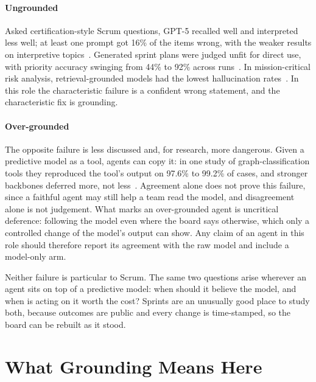 \documentclass[conference]{IEEEtran}
\begin{document}
\paragraph{Ungrounded} Asked certification-style Scrum questions, GPT-5 recalled well and interpreted less well; at least one prompt got 16\% of the items wrong, with the weaker results on interpretive topics~\cite{psm}. Generated sprint plans were judged unfit for direct use, with priority accuracy swinging from 44\% to 92\% across runs~\cite{yoon}. In mission-critical risk analysis, retrieval-grounded models had the lowest hallucination rates~\cite{esem24}. In this role the characteristic failure is a confident wrong statement, and the characteristic fix is grounding.

\paragraph{Over-grounded} The opposite failure is less discussed and, for research, more dangerous. Given a predictive model as a tool, agents can copy it: in one study of graph-classification tools they reproduced the tool's output on 97.6\% to 99.2\% of cases, and stronger backbones deferred more, not less~\cite{tool}. Agreement alone does not prove this failure, since a faithful agent may still help a team read the model, and disagreement alone is not judgement. What marks an over-grounded agent is uncritical deference: following the model even where the board says otherwise, which only a controlled change of the model's output can show. Any claim of an agent in this role should therefore report its agreement with the raw model and include a model-only arm.

Neither failure is particular to Scrum. The same two questions arise wherever an agent sits on top of a predictive model: when should it believe the model, and when is acting on it worth the cost? Sprints are an unusually good place to study both, because outcomes are public and every change is time-stamped, so the board can be rebuilt as it stood.

\section{What Grounding Means Here}
\label{sec:ground}
\end{document}
